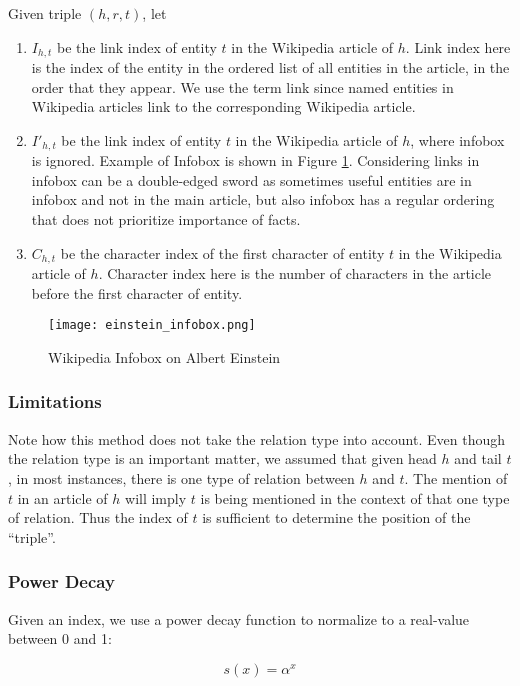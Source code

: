 \documentclass{article}
\begin{document}
Given triple $(h,r,t)$, let
\begin{enumerate}
\item $I_{h,t}$ be the link index of entity $t$ in the Wikipedia article of $h$. Link index here is the index of the entity in the ordered list of all entities in the article, in the order that they appear. We use the term link since named entities in Wikipedia articles link to the corresponding Wikipedia article.
\item $I'_{h,t}$ be the link index of entity $t$ in the Wikipedia article of $h$, where infobox is ignored. Example of Infobox is shown in Figure \ref{img2}. Considering links in infobox can be a double-edged sword as sometimes useful entities are in infobox and not in the main article, but also infobox has a regular ordering that does not prioritize importance of facts.
\item $C_{h,t}$ be the character index of the first character of entity $t$ in the Wikipedia article of $h$. Character index here is the number of characters in the article before the first character of entity.
\end{enumerate}

\begin{figure}[h]
  \centering
  \texttt{[image: einstein\_infobox.png]}
  \caption{Wikipedia Infobox on Albert Einstein}
  \label{img2}
\end{figure}

\subsubsection{Limitations}

Note how this method does not take the relation type into account. Even though the relation type is an important matter, we assumed that given head $h$ and tail $t$, in most instances, there is one type of relation between $h$ and $t$. The mention of $t$ in an article of $h$ will imply $t$ is being mentioned in the context of that one type of relation. Thus the index of $t$ is sufficient to determine the position of the ``triple''.

\subsubsection{Power Decay}

Given an index, we use a power decay function to normalize to a real-value between 0 and 1:

\begin{equation}
  s(x) = \alpha^x
\end{equation}
\end{document}
